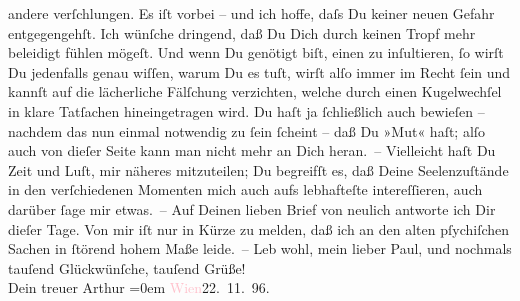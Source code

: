                andere verſchlungen. Es iſt vorbei – und ich hoffe, daſs Du keiner neuen Gefahr
                  entgegen{\pb}gehſt. Ich wünſche dringend, daß Du Dich
               durch keinen Tropf mehr beleidigt fühlen mögeſt. Und wenn Du genötigt biſt, einen zu
               inſultieren, ſo wirſt Du jedenfalls genau wiſſen, warum Du es tuſt, wirſt alſo immer
               im Recht ſein und kannſt auf die lächerliche Fälſchung verzichten, welche durch einen
               Kugelwechſel in klare Tatſachen hineingetragen wird. Du haſt ja ſchließlich auch
               bewieſen – nachdem das nun einmal notwendig zu ſein ſcheint – daß Du »Mut« haſt; alſo
               auch von dieſer Seite kann man nicht mehr an Dich heran. –\pend
           \pstart
           {\pb}Vielleicht haſt Du Zeit und Luſt, mir näheres
               mitzuteilen; Du begreifſt es, daß Deine Seelenzuſtände in den verſchiedenen Momenten
               mich auch aufs lebhafteſte intereſſieren, auch darüber ſage mir etwas. –\pend
           \pstart
           Auf Deinen lieben Brief von neulich antworte ich Dir dieſer Tage. Von mir iſt nur in
               Kürze zu melden, daß ich an den alten pſychiſchen Sachen in ſtörend hohem Maße
               leide. –\pend
           \pstart
           Leb wohl, mein lieber Paul, und nochmals tauſend Glückwünſche, tauſend Grüße!
               {\\[\baselineskip]}Dein treuer \spacefill\mbox{Arthur}\pend
           \leftskip=0em{}\pstart
           \textcolor{pink}{Wien}{}\ledrightnote{\textcolor{pink}{Wien}}{ }22. 11. 96.\pend
           \endnumbering{}  
      